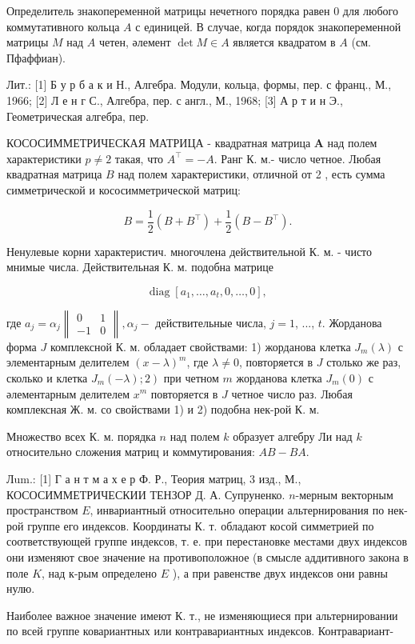 \documentclass[10pt]{article}
\begin{document}
Определитель знакопеременной матрицы нечетного порядка равен 0 для любого коммутативного кольца $A$ с единицей. В случае, когда порядок знакопеременной матрицы $M$ над $A$ четен, әлемент $\operatorname{det} M \in A$ является квадратом в $A$ (см. Пфаффиан).



Лит.: [1] Б у р б а к и Н., Алгебра. Модули, кольца, формы, пер. с франц., М., 1966; [2] Л е н г С., Алгебра, пер. с англ., М., 1968; [3] А р т и н Э., Геометрическая алгебра, пер.



КОСОСИММЕТРИЧЕСКАЯ МАТРИЦА - квадратная матрица $\boldsymbol{A}$ над полем характеристики $p \neq 2$ такая, что $A^{\top}=-A$. Ранг К. м.- число четное. Любая квадратная матрица $B$ над полем характеристики, отличной от 2 , есть сумма симметрической и кососимметрической матриц:



\[

B=\frac{1}{2}\left(B+B^{\top}\right)+\frac{1}{2}\left(B-B^{\top}\right) .

\]



Ненулевые корни характеристич. многочлена действительной К. м. - чисто мнимые числа. Действительная К. м. подобна матрице



\[

\operatorname{diag}\left[a_{1}, \ldots, a_{t}, 0, \ldots, 0\right] \text {, }

\]



где $a_{j}=\alpha_{j}\left\|\begin{array}{rr}0 & 1 \\ -1 & 0\end{array}\right\|, \alpha_{j}-$ действительные числа, $j=1$, ..., $t$. Жорданова форма $J$ комплексной К. м. обладает свойствами: 1) жорданова клетка $J_{m}(\lambda)$ с элементарным делителем $(x-\lambda)^{m}$, где $\lambda \neq 0$, повторяется в $J$ столько же раз, сколько и клетка $\left.J_{m}(-\lambda) ; 2\right)$ при четном $m$ жорданова клетка $J_{m}(0)$ с әлементарным делителем $x^{m}$ повторяется в $J$ четное число раз. Любая комплексная Ж. м. со свойствами 1) и 2) подобна нек-рой К. м.



Множество всех К. м. порядка $n$ над полем $k$ образует алгебру Ли над $k$ относительно сложения матриц и коммутирования: $A B-B A$.



Лum.: [1] Г а н т м а х е р Ф. Р., Теория матриц, 3 изд., М., КОСОСИММЕТРИЧЕСКИИ ТЕНЗОР Д. А. Супруненко. $n$-мерным векторным пространством $E$, инвариантный относительно операции альтернирования по нек-рой группе его индексов. Координаты К. т. обладают косой симметрией по соответствующей группе индексов, т. е. при перестановке местами двух индексов они изменяют свое значение на противоположное (в смысле аддитивного закона в поле $K$, над к-рым определено $E$ ), а при равенстве двух индексов они равны нулю.



Наиболее важное значение имеют К. т., не изменяющиеся при альтернировании по всей группе ковариантных или контравариантных индексов. Контравариант-
\end{document}
